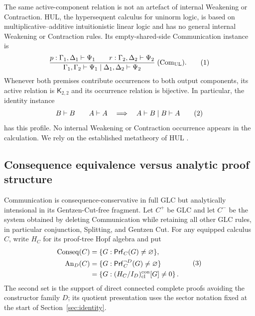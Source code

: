 \documentclass[10pt,a4paper]{article}
\theoremstyle{plain}
\theoremstyle{definition}
\theoremstyle{remark}
\newcommand{\ms}{\mathrel{\vdash}}
\newcommand{\Prf}{\mathsf{Prf}}
\newcommand{\eqtag}{\refstepcounter{equation}\tag{\theequation}}
\begin{document}
The same active-component relation is not an artefact of internal Weakening or
Contraction.  HUL, the hypersequent calculus for uninorm logic, is based on
multiplicative--additive intuitionistic linear logic and has no general
internal Weakening or Contraction rules.  Its empty-shared-side
Communication instance is
\[
\frac{
 p:\Gamma_1,\Delta_1\ms\Psi_1
 \qquad
 r:\Gamma_2,\Delta_2\ms\Psi_2
}{
 \Gamma_1,\Gamma_2\ms\Psi_1
 \mid
 \Delta_1,\Delta_2\ms\Psi_2
}\;(\mathrm{Com}_{\mathrm{UL}}).
\eqtag\label{eq:hul-communication}
\]
Whenever both premises contribute occurrences to both output components,
its active relation is \(\mathsf K_{2,2}\) and its occurrence relation is
bijective.  In particular, the identity instance
\[
       B\ms B\qquad A\ms A
       \quad\Longrightarrow\quad
       A\ms B\mid B\ms A
\eqtag\label{eq:hul-comparability}
\]
has this profile.  No internal Weakening or Contraction occurrence appears in the
calculation.  We rely on the established metatheory of HUL
\cite{metcalfemontagna2007,baldi2014}.

\subsection{Consequence equivalence versus analytic proof structure}

Communication is consequence-conservative in full GLC but analytically
intensional in its Gentzen-Cut-free fragment.  Let \(C^+\) be GLC and let
\(C^-\) be the system obtained by deleting Communication while retaining
all other GLC rules, in particular conjunction, Splitting, and Gentzen
Cut.
For any equipped calculus \(C\), write \(H_C\) for its proof-tree Hopf
algebra and put
\[
\begin{aligned}
 \operatorname{Conseq}(C)
   &=\{G:\Prf_C(G)\ne\varnothing\},\\
 \operatorname{An}_{D}(C)
   &=\{G:\Prf_C^{\neg D}(G)\ne\varnothing\}\\
   &=\left\{G:
      (H_C/I_D)_{\mathrm{cl}}^{\mathrm{con}}[G]\ne0
     \right\}.
\end{aligned}
\eqtag\label{eq:consequence-analytic-support}
\]
The second set is the support of direct connected complete proofs avoiding
the constructor family \(D\); its quotient presentation uses the sector
notation fixed at the start of Section~\ref{sec:identity}.
\end{document}
